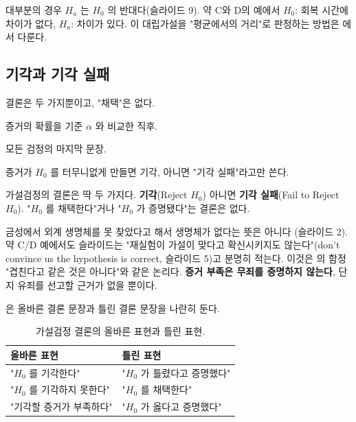 대부분의 경우 $H_a$ 는 $H_0$ 의 반대다(슬라이드 9). 약 C와 D의 예에서
$H_0$: 회복 시간에 차이가 없다, $H_a$: 차이가 있다. 이 대립가설을 "평균에서의
거리"로 판정하는 방법은 에서 다룬다.

\subsection{기각과 기각 실패}
\label{sec:ht-decision}

\begin{inbrief}
  \item[Why] 결론은 두 가지뿐이고, "채택"은 없다.
  \item[When] 증거의 확률을 기준 $\alpha$ 와 비교한 직후.
  \item[Where] 모든 검정의 마지막 문장.
  \item[How] 증거가 $H_0$ 를 터무니없게 만들면 기각, 아니면 "기각
             실패"라고만 쓴다.
\end{inbrief}

가설검정의 결론은 딱 두 가지다. \textbf{기각}(Reject $H_0$) 아니면
\textbf{기각 실패}(Fail to Reject $H_0$). "$H_0$ 를 채택한다"거나 "$H_0$ 가
증명됐다"는 결론은 없다.

\begin{pitfall}
\label{pit:ht-fail-not-proof}
금성에서 외계 생명체를 못 찾았다고 해서 생명체가 없다는 뜻은 아니다
(슬라이드 2). 약 C/D 예에서도 슬라이드는 "재실험이 가설이 맞다고 확신시키지도
않는다"(don't convince us the hypothesis is correct, 슬라이드 5)고 분명히
적는다. 이것은 의 함정 "겹친다고 같은 것은
아니다"와 같은 논리다. \textbf{증거 부족은 무죄를 증명하지 않는다}, 단지
유죄를 선고할 근거가 없을 뿐이다.
\end{pitfall}

은 올바른 결론 문장과 틀린 결론 문장을 나란히 둔다.

\begin{table}[H]\centering
\begin{tabularx}{\linewidth}{@{}X X@{}}
\toprule
올바른 표현 & 틀린 표현 \\
\midrule
"$H_0$ 를 기각한다" & "$H_0$ 가 틀렸다고 증명했다" \\
\midrule
"$H_0$ 를 기각하지 못한다" & "$H_0$ 를 채택한다" \\
\midrule
"기각할 증거가 부족하다" & "$H_0$ 가 옳다고 증명했다" \\
\bottomrule
\end{tabularx}
\caption{가설검정 결론의 올바른 표현과 틀린 표현.}
\label{tab:ht-wording}
\end{table}

